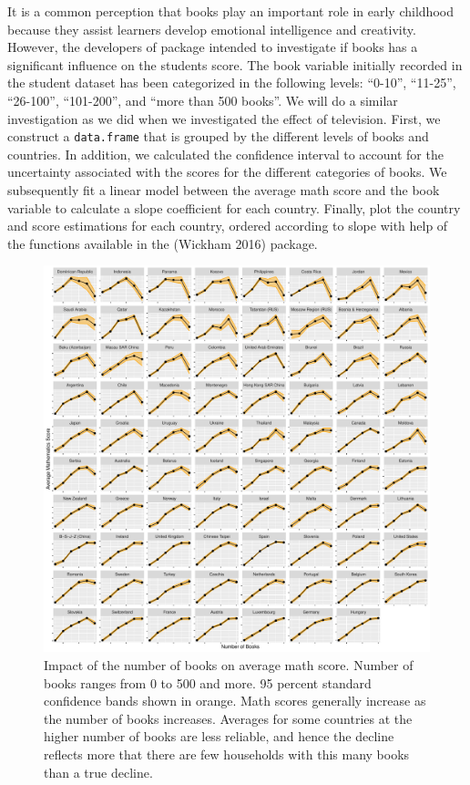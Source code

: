 It is a common perception that books play an important role in early childhood because they assist learners develop emotional intelligence and creativity. However, the developers of  package intended to investigate if books has a significant influence on the students score. The book variable initially recorded in the student dataset has been categorized in the following levels: ``0-10'', ``11-25'', ``26-100'', ``101-200'', and ``more than 500 books''. We will do a similar investigation as we did when we investigated the effect of television. First, we construct a \texttt{data.frame} that is grouped by the different levels of books and countries. In addition, we calculated the confidence interval to account for the uncertainty associated with the scores for the different categories of books. We subsequently fit a linear model between the average math score and the book variable to calculate a slope coefficient for each country. Finally, plot the country and score estimations for each country, ordered according to slope with help of the functions available in the  (Wickham 2016) package.

\begin{figure}[H]
\includegraphics[width=1\linewidth]{learningtower_files/figure-latex/book-plot-1} \caption{Impact of the number of books on average math score. Number of books ranges from 0 to 500 and more. 95 percent standard confidence bands shown in orange. Math scores generally increase as the number of books increases. Averages for some countries at the higher number of books are less reliable, and hence the decline reflects more that there are few households with this many books than a true decline.}\label{fig:book-plot}
\end{figure}

